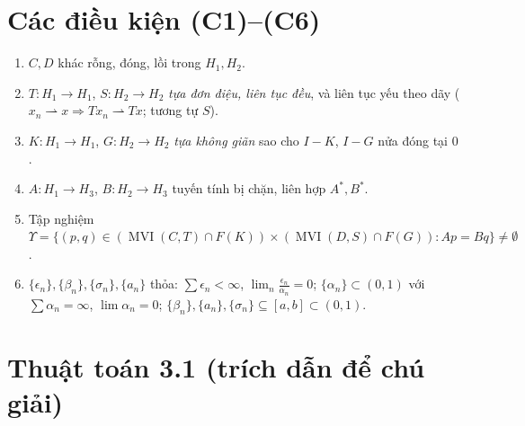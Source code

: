 \documentclass{MyBook}
\theoremstyle{plain}
\theoremstyle{definition}
\newcommand{\Fix}{F}
\DeclareMathOperator{\MVI}{MVI}
\begin{document}
\chapter{Các điều kiện (C1)--(C6)}
\begin{enumerate}[label=(C\arabic*),leftmargin=2.4em,itemsep=1pt]
\item $C,D$ khác rỗng, đóng, lồi trong $H_1,H_2$.
\item $T:H_1\to H_1$, $S:H_2\to H_2$ \emph{tựa đơn điệu, liên tục đều}, và liên tục yếu theo dãy ($x_n\rightharpoonup x\Rightarrow Tx_n\rightharpoonup Tx$; tương tự $S$).
\item $K:H_1\to H_1$, $G:H_2\to H_2$ \emph{tựa không giãn} sao cho $I-K$, $I-G$ nửa đóng tại $0$.
\item $A:H_1\to H_3$, $B:H_2\to H_3$ tuyến tính bị chặn, liên hợp $A^{*},B^{*}$.
\item Tập nghiệm $\Upsilon=\bigl\{(p,q)\in(\MVI(C,T)\cap \Fix(K))\times(\MVI(D,S)\cap \Fix(G)):Ap=Bq\bigr\}\ne\emptyset$.
\item $\{\epsilon_n\},\{\beta_n\},\{\sigma_n\},\{a_n\}$ thỏa: $\sum\epsilon_n<\infty$, $\lim_n\tfrac{\epsilon_n}{\alpha_n}=0$; $\{\alpha_n\}\subset(0,1)$ với $\sum\alpha_n=\infty$, $\lim\alpha_n=0$; $\{\beta_n\},\{a_n\},\{\sigma_n\}\subseteq[a,b]\subset(0,1)$.
\end{enumerate}

\chapter{Thuật toán 3.1 (trích dẫn để chú giải)}
\end{document}
